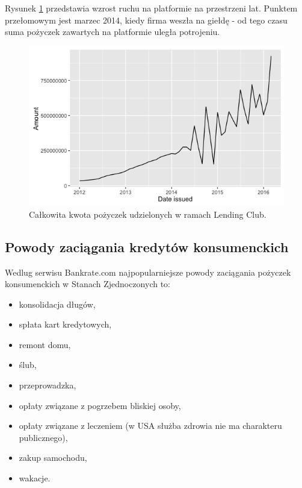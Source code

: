 Rysunek \ref{lc:amnt_growth} przedstawia wzrost ruchu na platformie na przestrzeni lat. Punktem przełomowym jest marzec 2014, kiedy firma weszła na giełdę - od tego czasu suma pożyczek zawartych na platformie uległa potrojeniu.

\begin{figure}[h] \centering %
	\includegraphics[scale=0.5]{img/loanbook_growth.png}
	\caption{Całkowita kwota pożyczek udzielonych w ramach Lending Club.}
	\label{lc:amnt_growth}
\end{figure}

\subsection{Powody zaciągania kredytów konsumenckich}

Wedlug serwisu Bankrate.com \cite{bankrate} najpopularniejsze powody zaciągania pożyczek konsumenckich w Stanach Zjednoczonych to:

\begin{itemize}
	\item konsolidacja długów,
	\item spłata kart kredytowych,
	\item remont domu,
	\item ślub,
	\item przeprowadzka,
	\item opłaty związane z pogrzebem bliskiej osoby,
	\item opłaty związane z leczeniem (w USA służba zdrowia nie ma charakteru publicznego),
	\item zakup samochodu,
	\item wakacje.
\end{itemize}

